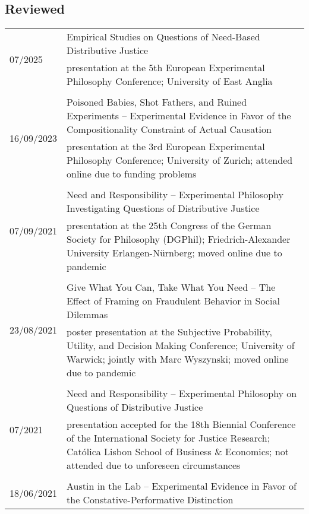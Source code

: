 \documentclass[a4paper,10pt]{article}
\begin{document}
\subsection*{Reviewed}
\begin{longtable}{p{2.25cm}p{11cm}}
\multirow{2}{2.25cm}{\footnotesize{07/2025}} & Empirical Studies on Questions of Need-Based Distributive Justice\\
& \footnotesize{presentation at the 5th European Experimental Philosophy Conference; University of East Anglia}\\
\\
\multirow{2}{2.25cm}{\footnotesize{16/09/2023}} & Poisoned Babies, Shot Fathers, and Ruined Experiments -- Experimental Evidence in Favor of the Compositionality Constraint of Actual Causation\\
& \footnotesize{presentation at the 3rd European Experimental Philosophy Conference; University of Zurich; attended online due to funding problems}\\
\\
\multirow{2}{2.25cm}{\footnotesize{07/09/2021}} & Need and Responsibility -- Experimental Philosophy Investigating Questions of Distributive Justice\\
& \footnotesize{presentation at the 25th Congress of the German Society for Philosophy (DGPhil); Friedrich-Alexander University Erlangen-Nürnberg; moved online due to pandemic}\\
\\
\multirow{2}{2.25cm}{\footnotesize{23/08/2021}} & Give What You Can, Take What You Need -- The Effect of Framing on Fraudulent Behavior in Social Dilemmas\\
& \footnotesize{poster presentation at the Subjective Probability, Utility, and Decision Making Conference; University of Warwick; jointly with Marc Wyszynski; moved online due to pandemic}\\
\\
\multirow{2}{2.25cm}{\footnotesize{07/2021}} & Need and Responsibility -- Experimental Philosophy on Questions of Distributive Justice\\
& \footnotesize{presentation accepted for the 18th Biennial Conference of the International Society for Justice Research; Católica Lisbon School of Business \& Economics; not attended due to unforeseen circumstances}\\
\\
\multirow{2}{2.25cm}{\footnotesize{18/06/2021}} & Austin in the Lab -- Experimental Evidence in Favor of the Constative-Performative Distinction\\

\end{longtable}
\end{document}
